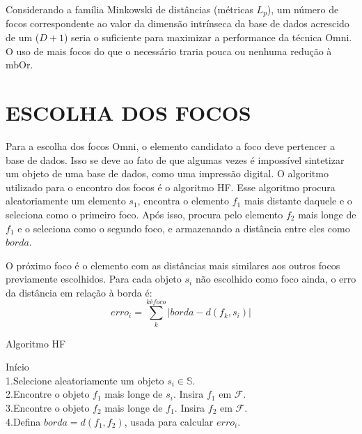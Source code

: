 Considerando a família Minkowski de distâncias (métricas $L_p$), um número de focos correspondente ao valor da
dimensão intrínseca da base de dados acrescido de um ($D+1$) seria o suficiente para maximizar a performance da técnica Omni. O uso de mais focos do que o 
necessário traria pouca ou nenhuma redução à mbOr.

\section{ESCOLHA DOS FOCOS}
\label{sec:escoco}
Para a escolha dos focos Omni, o elemento candidato a foco deve pertencer a base de dados. Isso se deve ao fato de que algumas vezes
é impossível sintetizar um objeto de uma base de dados, como uma impressão digital. O algoritmo utilizado para o encontro dos focos
é o algoritmo HF. Esse algoritmo procura aleatoriamente um elemento $s_1$, encontra o elemento $f_1$ mais distante daquele e o seleciona como
o primeiro foco. Após isso, procura pelo elemento $f_2$ mais longe de $f_1$ e o seleciona como o segundo foco, e armazenando
a distância entre eles como $borda$.\par

O próximo foco é o elemento com as distâncias mais similares aos outros focos previamente escolhidos. Para cada objeto
$s_i$ não escolhido como foco ainda, o erro da distância em relação à borda é:
\begin{equation}
 erro_i = \sum_{k}^{k é foco} |borda - d(f_k, s_i)|
\end{equation}

\begin{algorithm}
\label{alg:hf}
    \caption{Algoritmo HF}
    Início\\
       1.Selecione aleatoriamente um objeto $s_i \in \mathbb{S}$.\\
       2.Encontre o objeto $f_1$ mais longe de $s_i$. Insira $f_1$ em $\mathscr{F}$.\\
       3.Encontre o objeto $f_2$ mais longe de $f_1$. Insira $f_2$ em $\mathscr{F}$.\\
       4.Defina $borda=d(f_1,f_2)$, usada para calcular $erro_i$.\\
\end{algorithm}

